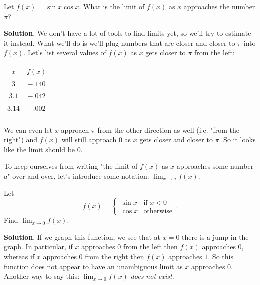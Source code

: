\documentclass[10pt,]{book}
\theoremstyle{ptxplainnotitle}
\theoremstyle{ptxplaintitle}
\theoremstyle{ptxplainnotitle}
\theoremstyle{ptxplaintitle}
\theoremstyle{ptxplainnotitle}
\theoremstyle{ptxplaintitle}
\theoremstyle{ptxdefinitionnotitle}
\theoremstyle{ptxdefinitiontitle}
\theoremstyle{ptxdefinitionnotitle}
\theoremstyle{ptxdefinitiontitle}
\theoremstyle{ptxdefinitionnotitle}
\theoremstyle{ptxdefinitiontitle}
\theoremstyle{ptxdefinitionnotitle}
\theoremstyle{ptxdefinitiontitle}
\theoremstyle{ptxdefinitionnotitle}
\theoremstyle{ptxdefinitiontitle}
\numberwithin{equation}{section}
\newcommand{\hrulethin}  {\noalign{\hrule height 0.04em}}
\newcommand{\hrulethick} {\noalign{\hrule height 0.11em}}
\begin{document}
\begin{example}\label{example-estimating-the-limit-of-a-trigonometric-function}
\hypertarget{p-6}{}%
Let \(f(x) = \sin x\cos x\). What is the limit of \(f(x)\) as \(x\) approaches the number \(\pi\)?%
\par\smallskip%
\noindent\textbf{Solution}.\hypertarget{solution-1}{}\quad%
\hypertarget{p-7}{}%
We don't have a lot of tools to find limits yet, so we'll try to estimate it instead. What we'll do is we'll plug numbers that are closer and closer to \(\pi\) into \(f(x)\). Let's list several values of \(f(x)\) as \(x\) gets closer to \(\pi\) from the left:%
\begin{table}
\centering
\begin{tabular}{cc}\hrulethick
\(x\)&\(f(x)\)\tabularnewline\hrulethin
\(3\)&\(-.140\)\tabularnewline[0pt]
\(3.1\)&\(-.042\)\tabularnewline[0pt]
\(3.14\)&\(-.002\)\tabularnewline\hrulethick
\end{tabular}
\end{table}
\hypertarget{p-8}{}%
We can even let \(x\) approach \(\pi\) from the other direction as well (i.e. "from the right") and \(f(x)\) will still approach \(0\) as \(x\) gets closer and closer to \(\pi\). So it looks like the limit should be \(0\).%
\end{example}
\hypertarget{p-9}{}%
To keep ourselves from writing "the limit of \(f(x)\) as \(x\) approaches some number \(a\)" over and over, let's introduce some notation: \(\lim_{x\to a}f(x)\).%
\begin{example}\label{example-limit-of-a-piecewise-function}
\hypertarget{p-10}{}%
Let%
%
\begin{equation*}
f(x) = \begin{cases} \sin x & \text{if $x<0$} \\ \cos x & \text{otherwise} \end{cases}.
\end{equation*}
\hypertarget{p-11}{}%
Find \(\lim_{x\to0}f(x)\).%
\par\smallskip%
\noindent\textbf{Solution}.\hypertarget{solution-2}{}\quad%
\hypertarget{p-12}{}%
If we graph this function, we see that at \(x=0\) there is a jump in the graph. In particular, if \(x\) approaches \(0\) from the left then \(f(x)\) approaches \(0\), whereas if \(x\) approaches \(0\) from the right then \(f(x)\) approaches \(1\). So this function does not appear to have an unambiguous limit as \(x\) approaches \(0\). Another way to say this: \(\lim_{x\to0}f(x)\) \emph{does not exist}.%
\end{example}
\end{document}
